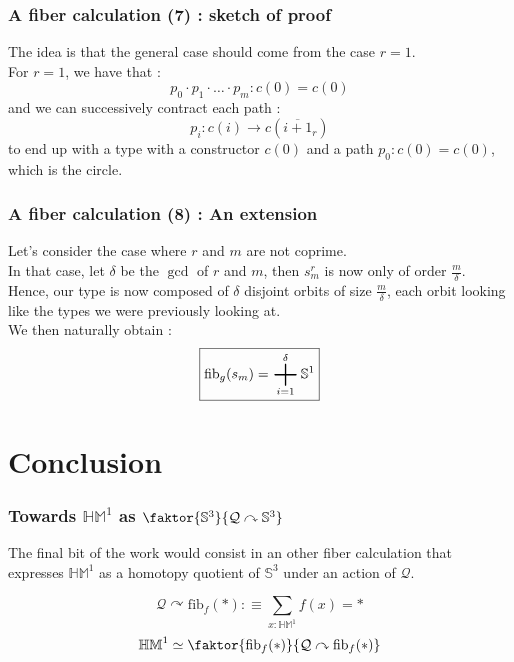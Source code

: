\documentclass{beamer}
\def\acts{\curvearrowright}
\DeclareMathOperator*{\bigplus}{\scalerel*{+}{\sum}}
\begin{document}
    \begin{frame}
        \frametitle{A fiber calculation (7) : sketch of proof}
        The idea is that the general case should come from the case $r=1$.\\
        \pause
        For $r=1$, we have that :
        $$p_0 \cdot p_1 \cdot \ldots \cdot p_m : c(0)=c(0)$$ 
        and we can successively contract each path  : 
        $$p_i : c(i)\rightarrow c(\overline{i+1}_r)$$
        to end up with a type with a constructor $c(0)$ and a path $p_0 : c(0) = c(0)$, which is the circle.
    \end{frame}
    \begin{frame}
        \frametitle{A fiber calculation (8) : An extension}
        Let's consider the case where $r$ and $m$ are not coprime. \\
        In that case, let $\delta$ be the $\gcd$ of $r$ and $m$, then $s_m^r$ is now only of order $\frac m{\delta}$. \\
        \pause
        Hence, our type is now composed of $\delta$ disjoint orbits of size $\frac m{\delta}$, each orbit looking like the types we were previously looking at. \\
        \pause
        We then naturally obtain : 
        $$\boxed{\mathrm{fib}_g(s_m) = \bigplus_{i=1}^{\delta} \mathbb{S}^1}$$
    \end{frame}
    \section{Conclusion}
    \begin{frame}[fragile]
        \frametitle{Towards $\mathbb{HM}^1$ as $\faktor{\mathbb{S}^3}{\mathcal{Q} \acts \mathbb{S}^3}$}
        The final bit of the work would consist in an other fiber calculation that expresses $\mathbb{HM}^1$ as a homotopy quotient of $\mathbb{S}^3$ under an action of $\mathcal{Q}$. 
        \pause
        \begin{center}    
        \end{center}
        \pause
        $$\mathcal{Q} \acts \mathrm{fib}_f(*) :\equiv \sum_{x : \mathbb{HM}^1} f(x) = *$$
        \pause
        $$ \mathbb{HM}^1 \simeq \faktor{\mathrm{fib}_f(*)}{\mathcal{Q} \acts \mathrm{fib}_f(*)}$$
    \end{frame}
\end{document}
